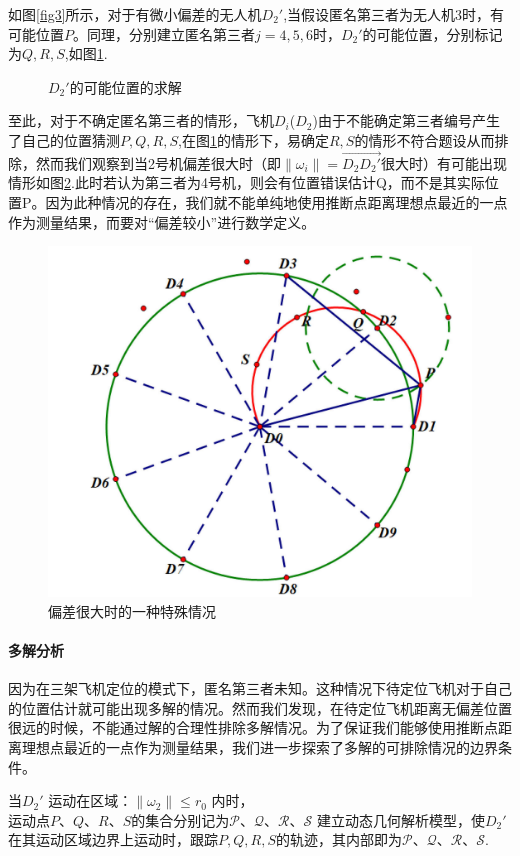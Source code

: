 \documentclass[withoutpreface,bwprint]{cumcmthesis} %
\begin{document}
		
			如图\ref{fig3}所示，对于有微小偏差的无人机$D_2'$,当假设匿名第三者为无人机3时，有可能位置$P$。同理，分别建立匿名第三者$j=4,5,6$时，$D_2'$的可能位置，分别标记为$Q,R,S$,如图\ref{fig4}.
			
			\begin{figure}[htb]
				\centering
				\caption{$D_2'$的可能位置的求解}
				\label{fig4}
			\end{figure}
			
			至此，对于不确定匿名第三者的情形，飞机$D_i$($D_2$)由于不能确定第三者编号产生了自己的位置猜测$P,Q,R,S$,在图\ref{fig4}的情形下，易确定$R,S$的情形不符合题设从而排除，然而我们观察到当2号机偏差很大时（即$\lVert\omega_i\rVert =\overrightarrow{D_2D_2'} $很大时）有可能出现情形如图\ref{fig6}.此时若认为第三者为4号机，则会有位置错误估计Q，而不是其实际位置P。因为此种情况的存在，我们就不能单纯地使用推断点距离理想点最近的一点作为测量结果，而要对“偏差较小”进行数学定义。
			\begin{figure}[htb]
				\centering
				\includegraphics[width=0.3\linewidth]{./figures/6}
				\caption{偏差很大时的一种特殊情况}
				\label{fig6}
			\end{figure}
		
		
			\paragraph{多解分析}
			因为在三架飞机定位的模式下，匿名第三者未知。这种情况下待定位飞机对于自己的位置估计就可能出现多解的情况。然而我们发现，在待定位飞机距离无偏差位置很远的时候，不能通过解的合理性排除多解情况。为了保证我们能够使用推断点距离理想点最近的一点作为测量结果，我们进一步探索了多解的可排除情况的边界条件。
			
			
			当$ D_2' $ 运动在区域：$ \lVert \omega _2 \rVert \le r_0 $ 内时，$ \text{运动点}P\text{、}Q\text{、}R\text{、}S\text{的集合分别记为}\mathcal{P}\text{、}\mathcal{Q}\text{、}\mathcal{R}\text{、}\mathcal{S} $ 建立动态几何解析模型，使$ D_2' $在其运动区域边界上运动时，跟踪$P,Q,R,S$的轨迹，其内部即为$\mathcal{P}\text{、}\mathcal{Q}\text{、}\mathcal{R}\text{、}\mathcal{S}$.
			
\end{document}
